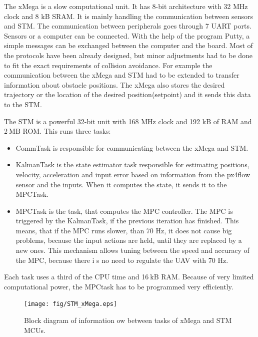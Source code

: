 \documentclass[a4paper,11pt,titlepage]{article}
\newcommand{\jed}[1]{\ensuremath{~\mathrm{#1}}}
\begin{document}
The xMega is a slow computational unit. It has 8-bit architecture with 32 MHz clock and 8 kB SRAM. It is mainly handling the communication between sensors and STM. The communication between peripherals goes through 7 UART ports. Sensors or a computer can be connected. With the help of the program Putty, a simple messages can be exchanged between the computer and the board. Most of the protocols have been already designed, but minor adjustments had to be done to fit the exact requirements of collision avoidance. For example the communication between the xMega and STM had to be extended to transfer information about obstacle positions. The xMega also stores the desired trajectory or the location of the desired position(setpoint) and it sends this data to the STM. 

The STM is a powerful 32-bit unit with 168 MHz clock and 192 kB of RAM and 2\jed{MB} ROM. This runs three tasks: 

\begin{itemize}
\item CommTask is responsible for communicating between the xMega and STM.

\item KalmanTask is the state estimator task responsible for estimating positions, velocity, acceleration and input error based on information from the px4flow sensor and the inputs. When it computes the state, it sends it to the MPCTask.

\item MPCTask is the task, that computes the MPC controller. The MPC is triggered by the KalmanTask, if the previous iteration has finished. This means, that if the MPC  runs slower, than 70 Hz, it does not cause big problems, because the input actions are held, until they are replaced by a new ones. This mechanism allows tuning between the speed and accuracy of the MPC, because there i	s no need to regulate the UAV with 70 Hz.
\end{itemize}

Each task uses a third of the CPU time and 16\jed{kB} RAM. Because of very limited computational power, the MPCtask has to be programmed very efficiently.

\begin{figure}[ht]
\centering
\texttt{[image: fig/STM\_xMega.eps]}
\caption{Block diagram of information 
ow between tasks of xMega and STM MCUs.}
\label{fig:feasibility_algorithm}
\end{figure}
\end{document}
